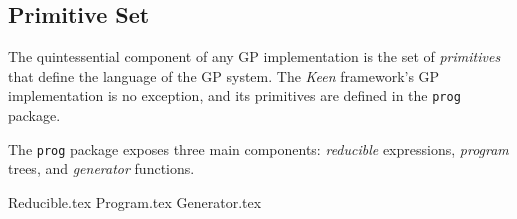 
\subsection{Primitive Set}
\label{sec:keen:gp:primitives}
  The quintessential component of any GP implementation is the set of
  \textit{primitives} that define the language of the GP system. The
  \textit{Keen} framework's GP implementation is no exception, and its
  primitives are defined in the \texttt{prog} package.

  The \texttt{prog} package exposes three main components: \emph{reducible}
  expressions, \emph{program} trees, and \emph{generator} functions.

  {Reducible.tex}
  {Program.tex}
  {Generator.tex}
